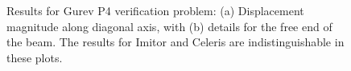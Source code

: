 \begin{figure}[ht!]
{\label{fig:gurev4-2}}		
%
\caption{Results for Gurev P4 verification problem: (a) Displacement magnitude along diagonal axis, with (b) details for the free end of the beam. The results for Imitor and Celeris are indistinguishable in these plots.}
\label{fig:gurev4}
\end{figure}

\begin{figure}[ht!]
\centering
{}		
\subfigure[]{%
}
\end{figure}
